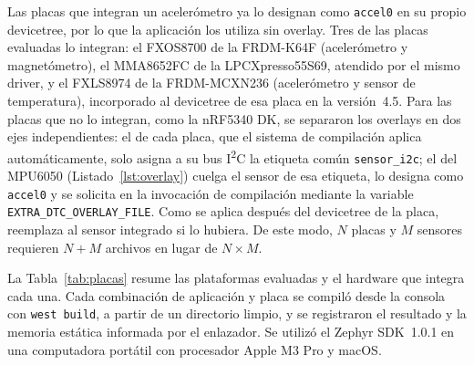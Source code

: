 Las placas que integran un acelerómetro ya lo designan como \texttt{accel0} en su propio devicetree, por lo que la aplicación los utiliza sin overlay. Tres de las placas evaluadas lo integran: el FXOS8700 de la FRDM-K64F (acelerómetro y magnetómetro), el MMA8652FC de la LPCXpresso55S69, atendido por el mismo driver, y el FXLS8974 de la FRDM-MCXN236 (acelerómetro y sensor de temperatura), incorporado al devicetree de esa placa en la versión~4.5. Para las placas que no lo integran, como la nRF5340 DK, se separaron los overlays en dos ejes independientes: el de cada placa, que el sistema de compilación aplica automáticamente, solo asigna a su bus I\textsuperscript{2}C la etiqueta común \texttt{sensor\_i2c}; el del MPU6050 (Listado~\ref{lst:overlay}) cuelga el sensor de esa etiqueta, lo designa como \texttt{accel0} y se solicita en la invocación de compilación mediante la variable \texttt{EXTRA\_DTC\_OVERLAY\_FILE}. Como se aplica después del devicetree de la placa, reemplaza al sensor integrado si lo hubiera. De este modo, $N$ placas y $M$ sensores requieren $N+M$ archivos en lugar de $N \times M$.

La Tabla~\ref{tab:placas} resume las plataformas evaluadas y el hardware que integra cada una. Cada combinación de aplicación y placa se compiló desde la consola con \texttt{west build}, a partir de un directorio limpio, y se registraron el resultado y la memoria estática informada por el enlazador. Se utilizó el Zephyr SDK~1.0.1 \cite{zephyr_sdk} en una computadora portátil con procesador Apple M3 Pro y macOS.

